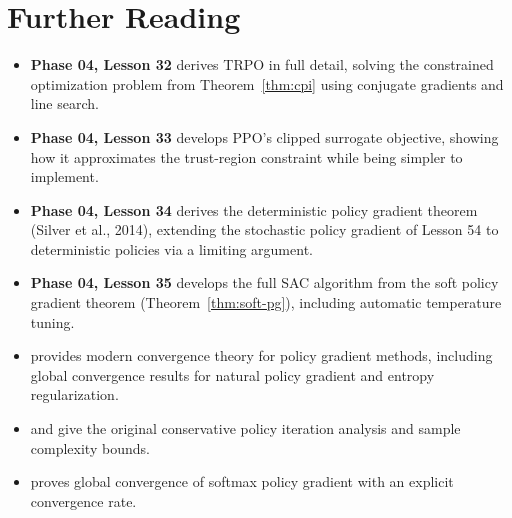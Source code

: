 \documentclass[11pt,a4paper]{article}
\begin{document}
\section{Further Reading}

\begin{itemize}
  \item \textbf{Phase 04, Lesson 32} derives TRPO in full detail,
    solving the constrained optimization problem from
    Theorem~\ref{thm:cpi} using conjugate gradients and line search.

  \item \textbf{Phase 04, Lesson 33} develops PPO's clipped surrogate
    objective, showing how it approximates the trust-region constraint
    while being simpler to implement.

  \item \textbf{Phase 04, Lesson 34} derives the deterministic policy
    gradient theorem (Silver et al., 2014), extending the stochastic
    policy gradient of Lesson 54 to deterministic policies via a
    limiting argument.

  \item \textbf{Phase 04, Lesson 35} develops the full SAC algorithm
    from the soft policy gradient theorem (Theorem~\ref{thm:soft-pg}),
    including automatic temperature tuning.

  \item \citet{agarwal2021} provides modern convergence theory for
    policy gradient methods, including global convergence results for
    natural policy gradient and entropy regularization.

  \item \citet{kakade2002cpi} and \citet{kakade2003} give the original
    conservative policy iteration analysis and sample complexity bounds.

  \item \citet{mei2020} proves global convergence of softmax policy
    gradient with an explicit convergence rate.
\end{itemize}


\end{document}
